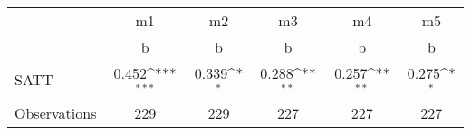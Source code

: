 {
\def\sym#1{\ifmmode^{#1}\else\(^{#1}\)\fi}
\begin{tabular}{l*{5}{c}}
\toprule
                    &          m1         &          m2         &          m3         &          m4         &          m5         \\
                    &           b         &           b         &           b         &           b         &           b         \\
\midrule
SATT                &       0.452\sym{***}&       0.339\sym{*}  &       0.288\sym{**} &       0.257\sym{**} &       0.275\sym{*}  \\
\midrule
Observations        &         229         &         229         &         227         &         227         &         227         \\
\bottomrule
\end{tabular}
}
